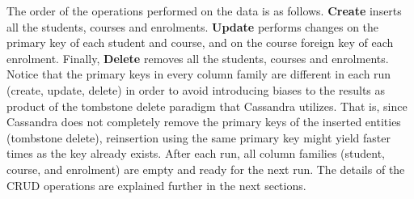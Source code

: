 The order of the operations performed on the data is as follows. \textbf{Create}
inserts all the students, courses and enrolments. \textbf{Update} performs
changes on the primary key of each student and course, and on the course foreign
key of each enrolment. Finally, \textbf{Delete} removes all the students,
courses and enrolments. Notice that the primary keys in every column family are
different in each run (create, update, delete) in order to avoid introducing
biases to the results as product of the tombstone delete paradigm that Cassandra
utilizes. That is, since Cassandra does not completely remove the primary keys
of the inserted entities (tombstone delete), reinsertion using the same primary
key might yield faster times as the key already exists. After each run, all
column families (student, course, and enrolment) are empty and ready for the
next run.  The details  of the \ac{CRUD} operations are explained further in the
next sections.
		
